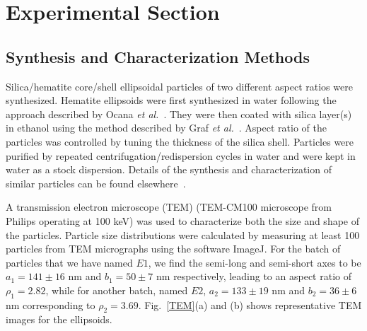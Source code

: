 \documentclass[aps,prl,preprint,superscriptaddress]{revtex4-1}
\begin{document}
\section{Experimental Section}
\subsection{Synthesis and Characterization Methods}
Silica/hematite core/shell ellipsoidal particles of two different aspect ratios were synthesized. Hematite ellipsoids were first synthesized in water following the approach described by Ocana \emph{et al.}~\cite{ocana1999homogeneous}. They were then coated with silica layer(s) in ethanol using the method described by Graf \emph{et al.}~\cite{graf2003general}. Aspect ratio of the particles was controlled by tuning the thickness of the silica shell. Particles were purified by repeated centrifugation/redispersion cycles in water and were kept in water as a stock dispersion. Details of the synthesis and characterization of similar particles can be found elsewhere~\cite{reufer2010morphology}.\par
A transmission electron microscope (TEM) (TEM-CM100 microscope from Philips operating at 100 keV) was used to characterize both the size and shape of the particles. Particle size distributions were calculated by measuring at least 100 particles from TEM micrographs using the software ImageJ. For the batch of particles that we have named $E1$, we find the semi-long and semi-short axes to be $a_1 = 141\pm 16$ nm and $b_1 = 50 \pm 7$ nm respectively, leading to an aspect ratio of $\rho_1 = 2.82$, while for another batch, named $E2$, $a_2 = 133 \pm 19$ nm and $b_2 = 36 \pm 6$ nm corresponding to $\rho_2 = 3.69$. Fig.~\ref{TEM}(a) and (b) shows representative TEM images for the ellipsoids.
\end{document}
